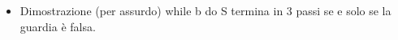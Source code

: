 \begin{itemize}
	\item Dimostrazione (per assurdo) while b do S termina in 3 passi se e solo se la guardia è falsa.
	
\end{itemize}